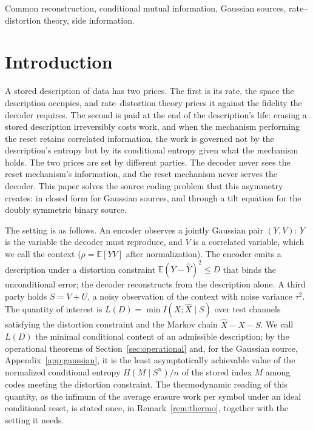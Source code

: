 \documentclass[11pt,onecolumn]{IEEEtran}
\newcommand{\E}{\mathbb{E}}
\newcommand{\hX}{\widehat{X}}
\newcommand{\hY}{\widehat{Y}}
\begin{document}
\begin{IEEEkeywords}
Common reconstruction, conditional mutual information, Gaussian sources,
rate--distortion theory, side information.
\end{IEEEkeywords}

\section{Introduction}
\label{sec:intro}

A stored description of data has two prices. The first is its rate, the space
the description occupies, and rate--distortion theory prices it against the
fidelity the decoder requires. The second is paid at the end of the
description's life: erasing a stored description irreversibly costs work, and
when the mechanism performing the reset retains correlated information, the
work is governed not by the description's entropy but by its conditional
entropy given what the mechanism holds. The two prices are set by different
parties. The decoder never sees the reset mechanism's information, and the
reset mechanism never serves the decoder. This paper solves the source coding problem that this
asymmetry creates: in closed form for Gaussian sources, and through a
tilt equation for the doubly symmetric binary source.

The setting is as follows. An encoder observes a jointly Gaussian pair
$(Y,V)$: $Y$ is the variable the decoder must reproduce, and $V$ is a
correlated variable, which we call the context ($\rho=\E[YV]$ after
normalization). The encoder emits a description under a distortion constraint
$\E(Y-\hY)^2\le D$ that binds the unconditional error; the decoder
reconstructs from the description alone. A third
party holds $S=V+U$, a noisy observation of the context with noise variance
$\tau^2$. The quantity of interest is
$L(D)=\min I(X;\hX\mid S)$ over test channels satisfying the distortion
constraint and the Markov chain $\hX-X-S$. We call $L(D)$ the minimal
conditional content of an admissible description; by the operational
theorems of Section~\ref{sec:operational} and, for the Gaussian source,
Appendix~\ref{app:gaussian}, it is the least asymptotically achievable
value of the normalized conditional entropy $H(M\mid S^n)/n$ of the stored
index $M$ among codes meeting the distortion constraint. The
thermodynamic reading of this quantity, as the infimum of the average erasure
work per symbol under an ideal conditional reset, is stated once, in
Remark~\ref{rem:thermo}, together with the setting it needs.
\end{document}
